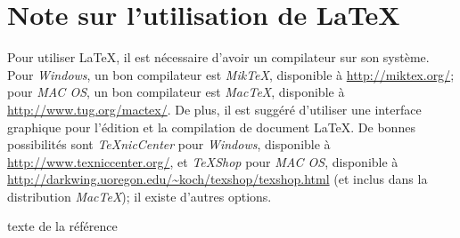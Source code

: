 \documentclass[10pt,letterpaper,twocolumn]{article}
\begin{document}
\section{Note sur l'utilisation de \LaTeX}

Pour utiliser \LaTeX, il est nécessaire d'avoir un compilateur sur son système. Pour {\em Windows}, un bon compilateur est {\em MikTeX}, disponible à \url{http://miktex.org/}; pour {\em MAC OS}, un bon compilateur est {\em MacTeX}, disponible à \url{http://www.tug.org/mactex/}. De plus, il est suggéré d'utiliser une interface graphique pour l'édition et la compilation de document \LaTeX. De bonnes possibilités sont {\em TeXnicCenter} pour {\em Windows}, disponible à \url{http://www.texniccenter.org/}, et {\em TeXShop} pour {\em MAC OS}, disponible à \url{http://darkwing.uoregon.edu/~koch/texshop/texshop.html} (et inclus dans la distribution {\em MacTeX}); il existe d'autres options.

\begin{thebibliography}{1}
 texte de la référence
\end{thebibliography}
\end{document}
